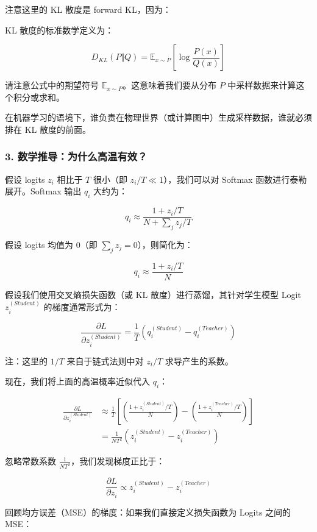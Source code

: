 注意这里的 KL 散度是 forward KL，因为：

KL 散度的标准数学定义为：

\[
D_{KL}(P \Vert Q) = \mathbb{E}_{x \sim P}\left[\log \frac{P(x)}{Q(x)}\right]
\]

请注意公式中的期望符号 \(\mathbb{E}_{x \sim P}\)。这意味着我们要从分布 \(P\) 中采样数据来计算这个积分或求和。

在机器学习的语境下，谁负责在物理世界（或计算图中）生成采样数据，谁就必须排在 KL 散度的前面。

\hypertarget{ux6570ux5b66ux63a8ux5bfcux4e3aux4ec0ux4e48ux9ad8ux6e29ux6709ux6548}{%
\subsubsection{3. 数学推导：为什么高温有效？}\label{ux6570ux5b66ux63a8ux5bfcux4e3aux4ec0ux4e48ux9ad8ux6e29ux6709ux6548}}

假设 logits \(z_i\) 相比于 \(T\) 很小（即 \(z_i / T \ll 1\)），我们可以对 Softmax 函数进行泰勒展开。Softmax 输出 \(q_i\) 大约为：

\[
q_i \approx \frac{1 + z_i / T}{N + \sum_j z_j / T}
\]

假设 logits 均值为 0（即 \(\sum_j z_j = 0\)），则简化为：

\[
q_i \approx \frac{1 + z_i / T}{N}
\]

假设我们使用交叉熵损失函数（或 KL 散度）进行蒸馏，其针对学生模型 Logit \(z_i^{(Student)}\) 的梯度通常形式为：

\[
\frac{\partial L}{\partial z_i^{(Student)}} = \frac{1}{T}\left(q_i^{(Student)} - q_i^{(Teacher)}\right)
\]

注：这里的 \(1/T\) 来自于链式法则中对 \(z_i / T\) 求导产生的系数。

现在，我们将上面的高温概率近似代入 \(q_i\)：

\[
\begin{aligned}
\frac{\partial L}{\partial z_i^{(Student)}} &\approx \frac{1}{T}\left[\left(\frac{1 + z_i^{(Student)} / T}{N}\right) - \left(\frac{1 + z_i^{(Teacher)} / T}{N}\right)\right] \\
&= \frac{1}{NT^2}\left(z_i^{(Student)} - z_i^{(Teacher)}\right)
\end{aligned}
\]

忽略常数系数 \(\frac{1}{NT^2}\)，我们发现梯度正比于：

\[
\frac{\partial L}{\partial z_i} \propto z_i^{(Student)} - z_i^{(Teacher)}
\]

回顾均方误差（MSE）的梯度：如果我们直接定义损失函数为 Logits 之间的 MSE：

